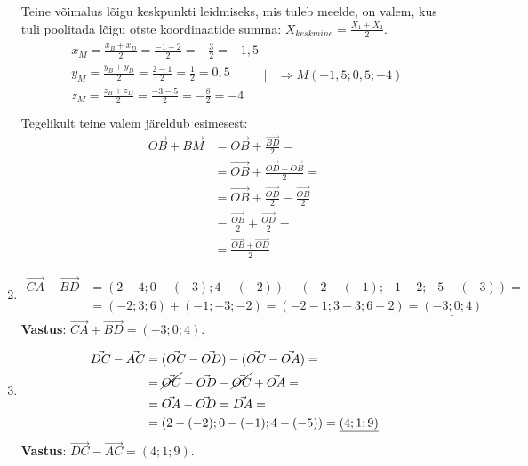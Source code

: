 \documentclass[10pt, a4paper]{article}
\begin{document}
\begin{enumerate}
Teine võimalus lõigu keskpunkti leidmiseks, mis tuleb meelde, on valem, kus tuli poolitada lõigu otste koordinaatide summa: $X_{keskmine} = \frac{X_1 + X_2}{2}$.
 \begin{align}
    \nonumber
    \begin{array}{l}
     x_M = \frac{x_B + x_D}{2} = \frac{-1 -2}{2} = -\frac{3}{2} = -1,5\\
     y_M = \frac{y_B + y_D}{2} = \frac{2 - 1}{2} = \frac{1}{2} = 0,5\\
     z_M = \frac{z_B + z_D}{2} = \frac{-3 - 5}{2} = -\frac{8}{2} = -4\\
     \end{array} \Bigg| &\Rightarrow M(-1,5; 0,5; -4)
\end{align}
Tegelikult teine valem järeldub esimesest:
\begin{align}
    \nonumber
    \vec{OB} + \vec{BM} &= \vec{OB} + \frac{\vec{BD}}{2} =\\
    \nonumber
    &= \vec{OB} + \frac{\vec{OD} - \vec{OB}}{2} = \\ \nonumber
    &= \vec{OB} + \frac{\vec{OD}}{2} - \frac{\vec{OB}}{2} \\ \nonumber
    &= \frac{\vec{OB}}{2} + \frac{\vec{OD}}{2} =\\ \nonumber
    &= \frac{\vec{OB} + \vec{OD}}{2}
\end{align}

\item
\begin{align}
    \nonumber
    \vec{CA} + \vec{BD} &= (2 - 4; 0 - (-3); 4 - (-2)) + (-2 - (-1); -1 - 2; -5 - (-3)) =\\ \nonumber
    &= (-2; 3; 6) + (-1; -3; -2) = (-2-1; 3-3; 6-2) = \underline{(-3; 0; 4)}
\end{align}
\textbf{Vastus}: $\vec{CA} + \vec{BD} = (-3; 0; 4)$.

\item
\begin{align}
    \nonumber
    \vec{DC} - \vec{AC} &= (\vec{OC} - \vec{OD}) - (\vec{OC} - \vec{OA}) = \\ \nonumber
    &= \cancel{\vec{OC}} - \vec{OD} - \cancel{\vec{OC}} + \vec{OA} = \\ \nonumber
    &= \vec{OA} - \vec{OD} = \vec{DA} = \\  \nonumber
    &= (2 - (-2); 0 - (-1); 4 - (-5)) = \underline{(4; 1; 9)}
\end{align}
\textbf{Vastus}: $\vec{DC} - \vec{AC} = (4; 1; 9)$.
 

\end{enumerate}
\end{document}
